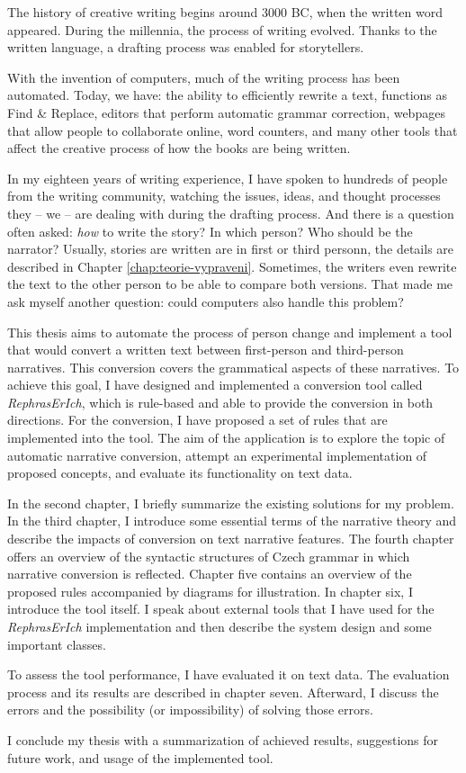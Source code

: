 The history of creative writing begins around 3000 BC, when the written word appeared. During the millennia, the process of writing evolved. Thanks to the written language, a drafting process was enabled for storytellers.

With the invention of computers, much of the writing process has been automated. Today, we have: the ability to efficiently rewrite a text, functions as Find \& Replace, editors that perform automatic grammar correction, webpages that allow people to collaborate online, word counters, and many other tools that affect the creative process of how the books are being written.

In my eighteen years of writing experience, I have spoken to hundreds of people from the writing community, watching the issues, ideas, and thought processes they -- we -- are dealing with during the drafting process. And there is a question often asked: \emph{how} to write the story? In which person? Who should be the narrator? Usually, stories are written are in first or third personn, the details are described in Chapter \ref{chap:teorie-vypraveni}. Sometimes, the writers even rewrite the text to the other person to be able to compare both versions. That made me ask myself another question: could computers also handle this problem?

This thesis aims to automate the process of person change and implement a tool that would convert a written text between first-person and third-person narratives. This conversion covers the grammatical aspects of these narratives. To achieve this goal, I have designed and implemented a conversion tool called \emph{RephrasErIch}, which is rule-based and able to provide the conversion in both directions. For the conversion, I have proposed a set of rules that are implemented into the tool. The aim of the application is to explore the topic of automatic narrative conversion, attempt an experimental implementation of proposed concepts, and evaluate its functionality on text data.

In the second chapter, I briefly summarize the existing solutions for my problem. In the third chapter, I introduce some essential terms of the narrative theory and describe the impacts of conversion on text narrative features. The fourth chapter offers an overview of the syntactic structures of Czech grammar in which narrative conversion is reflected. Chapter five contains an overview of the proposed rules accompanied by diagrams for illustration. In chapter six, I introduce the tool itself. I speak about external tools that I have used for the \emph{RephrasErIch} implementation and then describe the system design and some important classes.

To assess the tool performance, I have evaluated it on text data. The evaluation process and its results are described in chapter seven. Afterward, I discuss the errors and the possibility (or impossibility) of solving those errors.

I conclude my thesis with a summarization of achieved results, suggestions for future work, and usage of the implemented tool.


